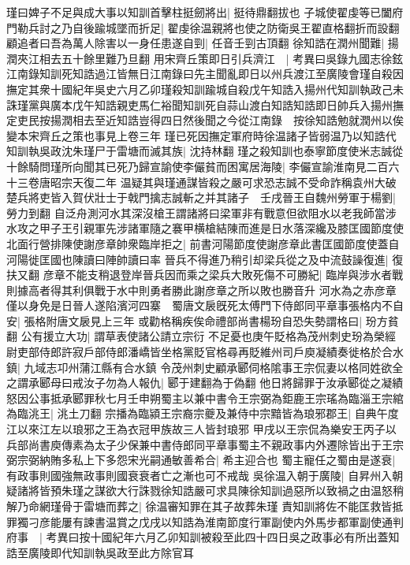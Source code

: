 瑾曰婢子不足與成大事以知訓首擊柱挺劒將出|{
	挺待鼎翻拔也}
子城使翟虔等已闔府門勒兵討之乃自後踰城墜而折足|{
	翟虔徐温親將也使之防衛吳王翟直格翻折而設翻}
顧追者曰吾為萬人除害以一身任患遂自剄|{
	任音壬剄古頂翻}
徐知誥在潤州聞難|{
	揚潤夾江相去五十餘里難乃旦翻}
用宋齊丘策即日引兵濟江　|{
	考異曰吳錄九國志徐鉉江南錄知訓死知誥過江皆無日江南錄曰先主聞亂即日以州兵渡江至廣陵會瑾自殺因撫定其衆十國紀年吳史六月乙卯瑾殺知訓踰城自殺戊午知誥入揚州代知訓執政己未誅瑾黨與廣本戊午知誥親吏馬仁裕聞知訓死自蒜山渡白知誥知誥即日帥兵入揚州撫定吏民按揚潤相去至近知誥豈得四日然後聞之今從江南錄　按徐知誥勉就潤州以俟變本宋齊丘之策也事見上卷三年}
瑾已死因撫定軍府時徐温諸子皆弱温乃以知誥代知訓執吳政沈朱瑾尸于雷塘而滅其族|{
	沈持林翻}
瑾之殺知訓也泰寧節度使米志誠從十餘騎問瑾所向聞其已死乃歸宣諭使李儼貧而困寓居海陵|{
	李儼宣諭淮南見二百六十三卷唐昭宗天復二年}
温疑其與瑾通謀皆殺之嚴可求恐志誠不受命詐稱袁州大破楚兵將吏皆入賀伏壯士于戟門擒志誠斬之并其諸子　壬戌晉王自魏州勞軍于楊劉|{
	勞力到翻}
自泛舟測河水其深沒槍王謂諸將曰梁軍非有戰意但欲阻水以老我師當涉水攻之甲子王引親軍先涉諸軍隨之褰甲横槍結陳而進是日水落深纔及膝匡國節度使北面行營排陳使謝彦章帥衆臨岸拒之|{
	前書河陽節度使謝彦章此書匡國節度使蓋自河陽徙匡國也陳讀曰陣帥讀曰率}
晉兵不得進乃稍引却梁兵從之及中流鼓譟復進|{
	復扶又翻}
彦章不能支稍退登岸晉兵因而乘之梁兵大敗死傷不可勝紀|{
	臨岸與涉水者戰則據高者得其利俱戰于水中則勇者勝此謝彦章之所以敗也勝音升}
河水為之赤彦章僅以身免是日晉人遂陷濱河四寨　蜀唐文扆旣死太傅門下侍郎同平章事張格内不自安|{
	張格附唐文扆見上三年}
或勸格稱疾俟命禮部尚書楊玢自恐失勢謂格曰|{
	玢方貧翻}
公有援立大功|{
	謂草表使諸公請立宗衍}
不足憂也庚午貶格為茂州刺史玢為榮經尉吏部侍郎許寂戶部侍郎潘嶠皆坐格黨貶官格尋再貶維州司戶庾凝績奏徙格於合水鎮|{
	九域志卭州蒲江縣有合水鎮}
令茂州刺史顧承郾伺格隂事王宗侃妻以格同姓欲全之謂承郾母曰戒汝子勿為人報仇|{
	郾于建翻為于偽翻}
他日將歸罪于汝承郾從之凝績怒因公事抵承郾罪秋七月壬申朔蜀主以兼中書令王宗弼為鉅鹿王宗瑤為臨淄王宗綰為臨洮王|{
	洮土刀翻}
宗播為臨潁王宗裔宗夔及兼侍中宗黯皆為琅邪郡王|{
	自典午度江以來江左以琅邪之王為衣冠甲族故三人皆封琅邪}
甲戌以王宗侃為樂安王丙子以兵部尚書庾傳素為太子少保兼中書侍郎同平章事蜀主不親政事内外遷除皆出于王宗弼宗弼納賄多私上下多怨宋光嗣通敏善希合|{
	希主迎合也}
蜀主寵任之蜀由是遂衰|{
	有政事則國強無政事則國衰衰者亡之漸也可不戒哉}
吳徐温入朝于廣陵|{
	自昇州入朝}
疑諸將皆預朱瑾之謀欲大行誅戮徐知誥嚴可求具陳徐知訓過惡所以致禍之由温怒稍解乃命網瑾骨于雷塘而葬之|{
	徐温審知罪在其子故葬朱瑾}
責知訓將佐不能匡救皆抵罪獨刁彦能屢有諫書温賞之戊戌以知誥為淮南節度行軍副使内外馬步都軍副使通判府事　|{
	考異曰按十國紀年六月乙卯知訓被殺至此四十四日吳之政事必有所出蓋知誥至廣陵即代知訓執吳政至此方除官耳}
